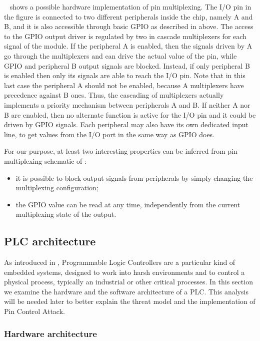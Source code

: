 ~ shows a possible hardware implementation of pin multiplexing.
The I/O pin in the figure is connected to two different peripherals inside the chip, namely A and B,
and it is also accessible through basic GPIO as described in  above.
The access to the GPIO output driver is regulated by two in cascade multiplexers for each signal of the module.
If the peripheral A is enabled, then the signals driven by A go through the multiplexers and can drive the actual value of the pin,
while GPIO and peripheral B output signals are blocked. Instead, if only peripheral B is enabled then only its signals are able to reach the I/O pin.
Note that in this last case the peripheral A should not be enabled, because A multiplexers have precedence against B ones.
Thus, the cascading of multiplexers actually implements a priority mechanism between peripherals A and B.
If neither A nor B are enabled, then no alternate function is active for the I/O pin and it could be driven by GPIO signals.
Each peripheral may also have its own dedicated input line, to get values from the I/O port in the same way as GPIO does.

For our purpose, at least two interesting properties can be inferred from pin multiplexing schematic of :
\begin{itemize}
	\item it is possible to block output signals from peripherals by simply changing the multiplexing configuration;
	\item the GPIO value can be read at any time, independently from the current multiplexing state of the output.
\end{itemize}


\subsection{PLC architecture}
\label{sec:plc_arch}

As introduced in , Programmable Logic Controllers are a particular kind of embedded systems,
designed to work into harsh environments and to control a physical process, typically an industrial or other critical processes.
In this section we examine the hardware and the software architecture of a PLC. This analysis will be needed later to better explain
the threat model and the implementation of Pin Control Attack.


\subsubsection{Hardware architecture}

